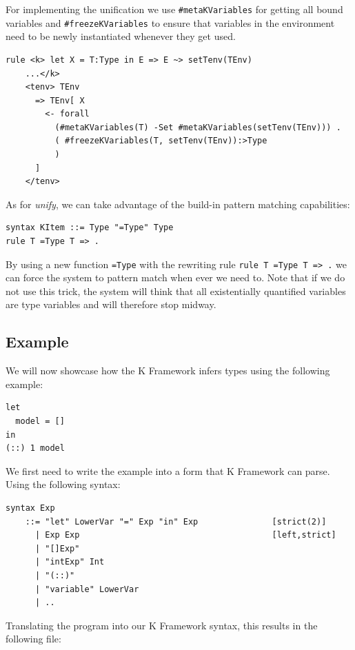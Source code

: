 \documentclass[]{scrbook}
\theoremstyle{definition}
\theoremstyle{definition}
\theoremstyle{definition}
\theoremstyle{remark}
\begin{document}
For implementing the unification we use \texttt{\#metaKVariables} for
getting all bound variables and \texttt{\#freezeKVariables} to ensure
that variables in the environment need to be newly instantiated whenever
they get used.

\begin{verbatim}
rule <k> let X = T:Type in E => E ~> setTenv(TEnv) 
    ...</k>
    <tenv> TEnv 
      => TEnv[ X 
        <- forall 
          (#metaKVariables(T) -Set #metaKVariables(setTenv(TEnv))) . 
          ( #freezeKVariables(T, setTenv(TEnv)):>Type
          )
      ]
    </tenv>
\end{verbatim}

As for \emph{unify}, we can take advantage of the build-in pattern
matching capabilities:

\begin{verbatim}
syntax KItem ::= Type "=Type" Type
rule T =Type T => .
\end{verbatim}

By using a new function \texttt{=Type} with the rewriting rule
\texttt{rule\ T\ =Type\ T\ =\textgreater{}\ .} we can force the system
to pattern match when ever we need to. Note that if we do not use this
trick, the system will think that all existentially quantified variables
are type variables and will therefore stop midway.

\subsection{Example}\label{example}

We will now showcase how the K Framework infers types using the
following example:

\begin{verbatim}
let
  model = []
in
(::) 1 model
\end{verbatim}

We first need to write the example into a form that K Framework can
parse. Using the following syntax:

\begin{verbatim}
syntax Exp
    ::= "let" LowerVar "=" Exp "in" Exp               [strict(2)]
      | Exp Exp                                       [left,strict]
      | "[]Exp"
      | "intExp" Int
      | "(::)"
      | "variable" LowerVar
      | ..
\end{verbatim}

Translating the program into our K Framework syntax, this results in the
following file:
\end{document}
